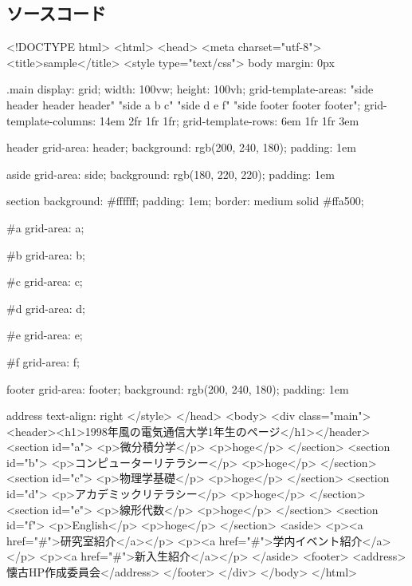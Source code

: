 \documentclass[12pt,a4j]{jarticle}
\begin{document}
\subsection{ソースコード}

<!DOCTYPE html>
<html>
<head>
    <meta charset="utf-8">
    <title>sample</title>
    <style type="text/css">
        body {
            margin: 0px
        }

        .main {
            display: grid;
            width: 100vw;
            height: 100vh;
            grid-template-areas: "side header header header" "side a b c" "side d e f" "side footer footer footer";
            grid-template-columns: 14em 2fr 1fr 1fr;
            grid-template-rows: 6em 1fr 1fr 3em
        }

        header {
            grid-area: header;
            background: rgb(200, 240, 180);
            padding: 1em
        }

        aside {
            grid-area: side;
            background: rgb(180, 220, 220);
            padding: 1em
        }

        section {
            background: #ffffff;
            padding: 1em;
            border: medium solid #ffa500;
        }

        #a {
            grid-area: a;
        }

        #b {
            grid-area: b;
        }

        #c {
            grid-area: c;
        }

        #d {
            grid-area: d;
        }

        #e {
            grid-area: e;
        }

        #f {
            grid-area: f;
        }

        footer {
            grid-area: footer;
            background: rgb(200, 240, 180);
            padding: 1em
        }

        address {
            text-align: right
        }
    </style>
</head>
<body>
<div class="main">
    <header><h1>1998年風の電気通信大学1年生のページ</h1></header>
    <section id="a">
        <p>微分積分学</p>
        <p>hoge</p>
    </section>
    <section id="b">
        <p>コンピューターリテラシー</p>
        <p>hoge</p>
    </section>
    <section id="c">
        <p>物理学基礎</p>
        <p>hoge</p>
    </section>
    <section id="d">
        <p>アカデミックリテラシー</p>
        <p>hoge</p>
    </section>
    <section id="e">
        <p>線形代数</p>
        <p>hoge</p>
    </section>
    <section id="f">
        <p>English</p>
        <p>hoge</p>
    </section>
    <aside>
        <p><a href="#">研究室紹介</a></p>
        <p><a href="#">学内イベント紹介</a></p>
        <p><a href="#">新入生紹介</a></p>
    </aside>
    <footer>
        <address>懐古HP作成委員会</address>
    </footer>
</div>
</body>
</html>
\end{document}
